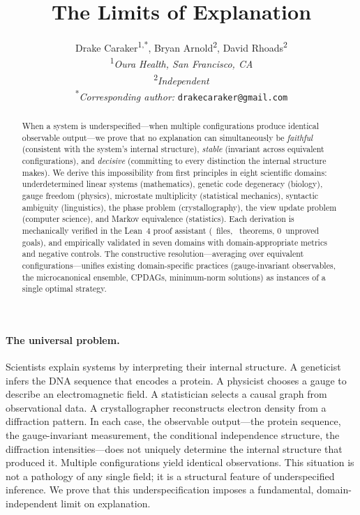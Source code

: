 \documentclass[11pt]{article}
\title{\Large\textbf{The Limits of Explanation}}
\author{%
  Drake Caraker\textsuperscript{1,*},
  Bryan Arnold\textsuperscript{2},
  David Rhoads\textsuperscript{2}
  \\[4pt]
  \textsuperscript{1}\textit{Oura Health, San Francisco, CA}
  \\[2pt]
  \textsuperscript{2}\textit{Independent}
  \\[2pt]
  \textsuperscript{*}\textit{Corresponding author:} \texttt{drakecaraker@gmail.com}
}
\date{}
\begin{document}
\maketitle


\begin{abstract}
When a system is underspecified---when multiple configurations produce
identical observable output---we prove that no explanation can simultaneously
be \emph{faithful} (consistent with the system's internal structure),
\emph{stable} (invariant across equivalent configurations), and
\emph{decisive} (committing to every distinction the internal structure
makes).  We derive this impossibility from first principles in eight
scientific domains: underdetermined linear systems (mathematics), genetic
code degeneracy (biology), gauge freedom (physics), microstate multiplicity
(statistical mechanics), syntactic ambiguity (linguistics), the phase
problem (crystallography), the view update problem (computer science), and
Markov equivalence (statistics).  Each derivation is mechanically verified
in the Lean~4 proof assistant (\ClaimMainFiles~files, \ClaimMainTheorems~theorems, 0~unproved goals),
and empirically validated in seven domains with domain-appropriate metrics
and negative controls.  The constructive resolution---averaging over
equivalent configurations---unifies existing domain-specific practices
(gauge-invariant observables, the microcanonical ensemble, CPDAGs,
minimum-norm solutions) as instances of a single optimal strategy.
\end{abstract}


\paragraph{The universal problem.}
Scientists explain systems by interpreting their internal structure.
A geneticist infers the DNA sequence that encodes a protein.
A physicist chooses a gauge to describe an electromagnetic field.
A statistician selects a causal graph from observational data.
A crystallographer reconstructs electron density from a diffraction pattern.
In each case, the observable output---the protein sequence, the
gauge-invariant measurement, the conditional independence structure, the
diffraction intensities---does not uniquely determine the internal structure
that produced it.  Multiple configurations yield identical observations.
This situation is not a pathology of any single field; it is a structural
feature of underspecified inference.  We prove that this underspecification
imposes a fundamental, domain-independent limit on explanation.
\end{document}
